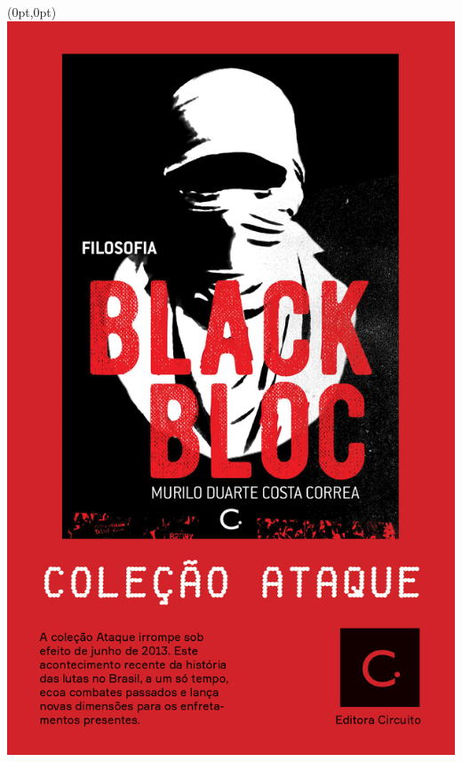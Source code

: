 \pagestyle{circuito}
\label{circuito}

\begin{textblock*}{5.625in}(0pt,0pt)%
\vspace*{-2.5cm}
\hspace*{-1.75cm}\includegraphics*[width=147mm]{./imgs/CIRCUITO.png}
\end{textblock*}

\pagebreak

\hspace{.5cm}

